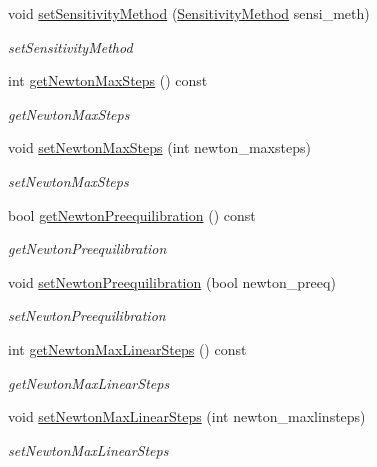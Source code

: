 \begin{DoxyCompactItemize}
\item 
void \mbox{\hyperlink{classamici_1_1_solver_a3a7713f2ce77ffade77445a825ad289d}{set\+Sensitivity\+Method}} (\mbox{\hyperlink{namespaceamici_aa0fa493529f6872e7e776b91fbbf38f9}{Sensitivity\+Method}} sensi\+\_\+meth)
\begin{DoxyCompactList}\small\item\em set\+Sensitivity\+Method \end{DoxyCompactList}\item 
int \mbox{\hyperlink{classamici_1_1_solver_ad68589cfe3af35633ff5fa1a4e7aaddb}{get\+Newton\+Max\+Steps}} () const
\begin{DoxyCompactList}\small\item\em get\+Newton\+Max\+Steps \end{DoxyCompactList}\item 
void \mbox{\hyperlink{classamici_1_1_solver_abf2e868e186c724c8ab939ba261ef314}{set\+Newton\+Max\+Steps}} (int newton\+\_\+maxsteps)
\begin{DoxyCompactList}\small\item\em set\+Newton\+Max\+Steps \end{DoxyCompactList}\item 
bool \mbox{\hyperlink{classamici_1_1_solver_a75aabe2e004edaba96db48b0abd3fc6f}{get\+Newton\+Preequilibration}} () const
\begin{DoxyCompactList}\small\item\em get\+Newton\+Preequilibration \end{DoxyCompactList}\item 
void \mbox{\hyperlink{classamici_1_1_solver_a8e71a26a59a4c3c03b362a72079377f2}{set\+Newton\+Preequilibration}} (bool newton\+\_\+preeq)
\begin{DoxyCompactList}\small\item\em set\+Newton\+Preequilibration \end{DoxyCompactList}\item 
int \mbox{\hyperlink{classamici_1_1_solver_a874c929a78d0e2af11c62ba958e1b3d1}{get\+Newton\+Max\+Linear\+Steps}} () const
\begin{DoxyCompactList}\small\item\em get\+Newton\+Max\+Linear\+Steps \end{DoxyCompactList}\item 
void \mbox{\hyperlink{classamici_1_1_solver_af9143ab28630d5db394f641df0a8e477}{set\+Newton\+Max\+Linear\+Steps}} (int newton\+\_\+maxlinsteps)
\begin{DoxyCompactList}\small\item\em set\+Newton\+Max\+Linear\+Steps \end{DoxyCompactList}\item 

\end{DoxyCompactItemize}
